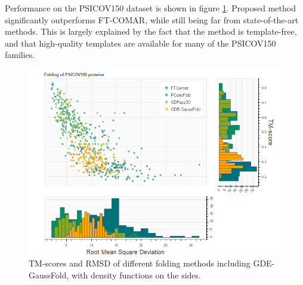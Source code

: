     Performance on the PSICOV150 dataset is shown in figure \ref{gde_results}.
    Proposed method significantly outperforms FT-COMAR, while still being 
    far from state-of-the-art methods. This is largely explained by the fact
    that the method is template-free, and that high-quality templates are
    available for many of the PSICOV150 families.

    \begin{figure}[H]
      \begin{center}
        \includegraphics[width=\textwidth, keepaspectratio]{imgs/gde.png}
         \caption{TM-scores and RMSD of different folding methods including
         GDE-GaussFold, with density functions on the sides.}
        \label{gde_results}
      \end{center}
    \end{figure}
